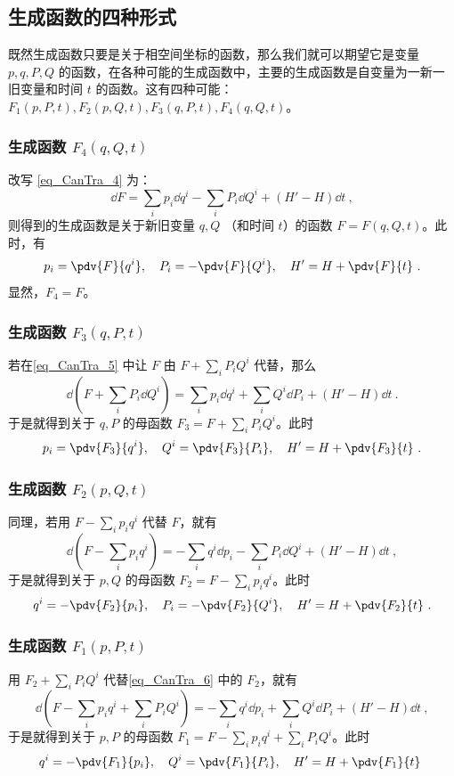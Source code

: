 \subsection{生成函数的四种形式}
既然生成函数只要是关于相空间坐标的函数，那么我们就可以期望它是变量 $p,q,P,Q$ 的函数，在各种可能的生成函数中，主要的生成函数是自变量为一新一旧变量和时间 $t$ 的函数。这有四种可能：$F_1(p,P,t),F_2(p,Q,t),F_3(q,P,t),F_4(q,Q,t)$。
\subsubsection{生成函数 $F_4(q,Q,t)$}
改写 \autoref{eq_CanTra_4} 为：
\begin{equation}\label{eq_CanTra_5}
\dd F=\sum_ip_i\dd q^i-\sum_iP_i\dd Q^i+(H'-H)\dd t~,
\end{equation}
则得到的生成函数是关于新旧变量 $q,Q$ （和时间 $t$）的函数 $F=F(q,Q,t)$。此时，有
\begin{equation}
p_i=\pdv{F}{q^i},\quad P_i=-\pdv{F}{Q^i},\quad H'=H+\pdv{F}{t}~.
\end{equation}
显然，$F_4=F$。
\subsubsection{生成函数 $F_3(q,P,t)$}
若在\autoref{eq_CanTra_5} 中让 $F$ 由 $F+\sum_iP_i Q^i$ 代替，那么
\begin{equation}
\dd (F+\sum_iP_i\dd Q^i)=\sum_i p_i\dd q^i+\sum_i Q^i\dd P_i+(H'-H)\dd t~.
\end{equation}
于是就得到关于 $q,P$ 的母函数 $F_3=F+\sum_iP_i Q^i$。此时
\begin{equation}\label{eq_CanTra_8}
p_i=\pdv{F_3}{q^i},\quad Q^i=\pdv{F_3}{P_i},\quad H'=H+\pdv{F_3}{t}~.
\end{equation}

\subsubsection{生成函数 $F_2(p,Q,t)$}
同理，若用 $F-\sum_ip_iq^i$ 代替 $F$，就有
\begin{equation}\label{eq_CanTra_6}
\dd (F-\sum_ip_i q^i)=-\sum_i q^i\dd p_i-\sum_i P_i\dd Q^i+(H'-H)\dd t~,
\end{equation}
于是就得到关于 $p,Q$ 的母函数 $F_2=F-\sum_ip_i q^i$。此时
\begin{equation}
q^i=-\pdv{F_2}{p_i},\quad P_i=-\pdv{F_2}{Q^i},\quad H'=H+\pdv{F_2}{t}~.
\end{equation}
\subsubsection{生成函数 $F_1(p,P,t)$}
用 $F_2+\sum_iP_iQ^i$ 代替\autoref{eq_CanTra_6} 中的 $F_2$，就有
\begin{equation}
\dd(F-\sum_ip_i q^i+\sum_i P_i Q^i)=-\sum_i q^i\dd p_i+\sum_i Q^i\dd P_i+(H'-H)\dd t~,
\end{equation}
于是就得到关于 $p,P$ 的母函数 $F_1=F-\sum_ip_i q^i+\sum_i P_i Q^i$。此时
\begin{equation}
q^i=-\pdv{F_1}{p_i},\quad Q^i=\pdv{F_1}{P_i},\quad H'=H+\pdv{F_1}{t}~
\end{equation}

